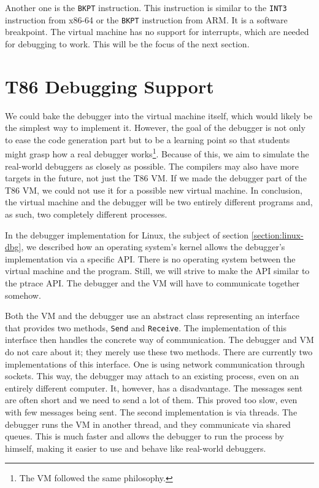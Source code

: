 Another one is the \texttt{BKPT} instruction. This instruction is similar to
the \texttt{INT3} instruction from x86-64 or the \texttt{BKPT} instruction from
ARM. It is a software breakpoint. The virtual machine has no support for
interrupts, which are needed for debugging to work. This will be the focus of
the next section.

\section{T86 Debugging Support}
We could bake the debugger into the virtual machine itself, which would likely
be the simplest way to implement it. However, the goal of the debugger is not
only to ease the code generation part but to be a learning point so that
students might grasp how a real debugger works\footnote{The VM followed the
same philosophy.}. Because of this, we aim to simulate the real-world debuggers
as closely as possible. The compilers may also have more targets in the future,
not just the T86 VM. If we made the debugger part of the T86 VM, we could not
use it for a possible new virtual machine. In conclusion, the virtual machine
and the debugger will be two entirely different programs and, as such, two
completely different processes.

In the debugger implementation for Linux, the subject of section
\ref{section:linux-dbg}, we described how an operating system's kernel allows
the debugger's implementation via a specific API. There is no operating system
between the virtual machine and the program. Still, we will strive to make the
API similar to the ptrace API. The debugger and the VM will have to communicate
together somehow.

Both the VM and the debugger use an abstract class representing an interface
that provides two methods, \texttt{Send} and \texttt{Receive}. The
implementation of this interface then handles the concrete way of
communication. The debugger and VM do not care about it; they merely use these
two methods. There are currently two implementations of this interface. One is
using network communication through sockets. This way, the debugger may attach
to an existing process, even on an entirely different computer. It, however,
has a disadvantage. The messages sent are often short and we need to send a lot
of them. This proved too slow, even with few messages being sent. The second
implementation is via threads. The debugger runs the VM in another thread, and
they communicate via shared queues. This is much faster and allows the debugger
to run the process by himself, making it easier to use and behave like
real-world debuggers.


